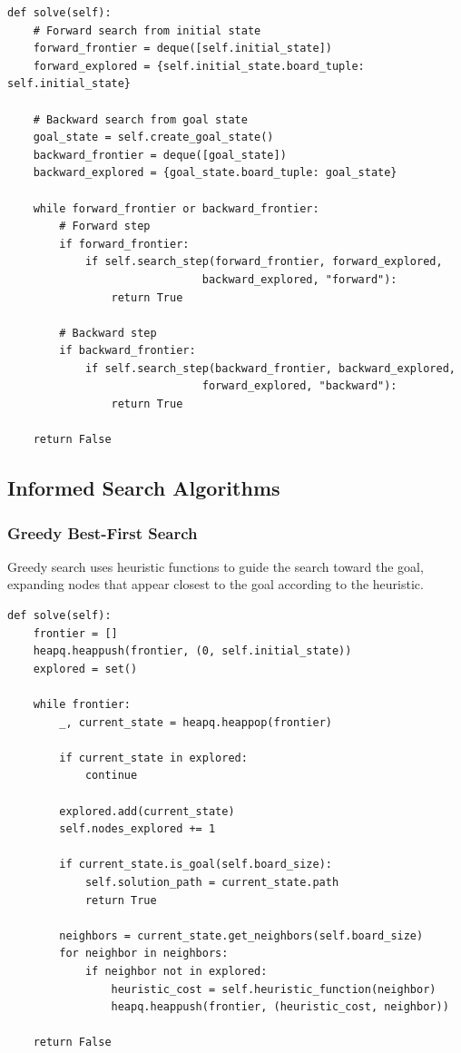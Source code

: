 \documentclass[11pt,a4paper]{article}
\begin{document}
\begin{lstlisting}[caption=Bidirectional Search Implementation]
def solve(self):
    # Forward search from initial state
    forward_frontier = deque([self.initial_state])
    forward_explored = {self.initial_state.board_tuple: self.initial_state}
    
    # Backward search from goal state
    goal_state = self.create_goal_state()
    backward_frontier = deque([goal_state])
    backward_explored = {goal_state.board_tuple: goal_state}
    
    while forward_frontier or backward_frontier:
        # Forward step
        if forward_frontier:
            if self.search_step(forward_frontier, forward_explored, 
                              backward_explored, "forward"):
                return True
                
        # Backward step
        if backward_frontier:
            if self.search_step(backward_frontier, backward_explored, 
                              forward_explored, "backward"):
                return True
                
    return False
\end{lstlisting}

\subsection{Informed Search Algorithms}

\subsubsection{Greedy Best-First Search}

Greedy search uses heuristic functions to guide the search toward the goal, expanding nodes that appear closest to the goal according to the heuristic.

\begin{lstlisting}[caption=Greedy Search with Heuristics]
def solve(self):
    frontier = []
    heapq.heappush(frontier, (0, self.initial_state))
    explored = set()
    
    while frontier:
        _, current_state = heapq.heappop(frontier)
        
        if current_state in explored:
            continue
            
        explored.add(current_state)
        self.nodes_explored += 1
        
        if current_state.is_goal(self.board_size):
            self.solution_path = current_state.path
            return True
            
        neighbors = current_state.get_neighbors(self.board_size)
        for neighbor in neighbors:
            if neighbor not in explored:
                heuristic_cost = self.heuristic_function(neighbor)
                heapq.heappush(frontier, (heuristic_cost, neighbor))
                
    return False
\end{lstlisting}
\end{document}
